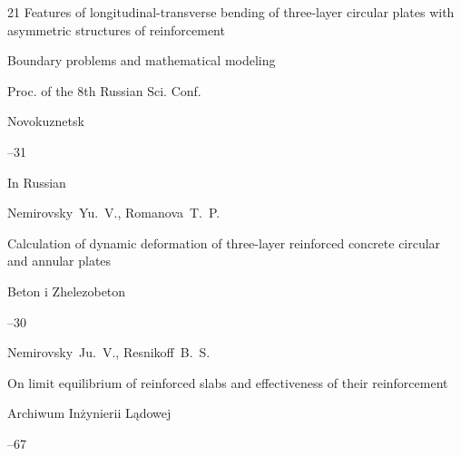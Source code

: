 \begin{thebibliography}{21}
\paper Features of longitudinal-transverse bending of three-layer circular plates with asymmetric structures of reinforcement

\inbook Boundary problems and mathematical modeling

\bookinfo Proc. of the 8th Russian Sci. Conf.

\publaddr Novokuznetsk



--31








\lang In Russian

\by Nemirovsky~Yu.~V., Romanova~T.~P.

\paper Calculation of dynamic deformation of three-layer reinforced concrete circular and annular plates

\jour Beton i Zhelezobeton



--30






\by Nemirovsky~Ju.~V., Resnikoff~B.~S.

\paper On limit equilibrium of reinforced slabs and effectiveness of their reinforcement

\jour Archiwum In\.zynierii L\k{a}dowej




--67



\end{thebibliography}



\EngDate



\renewcommand{\baselinestretch}{0.9}



\newpage

\Russian







%

